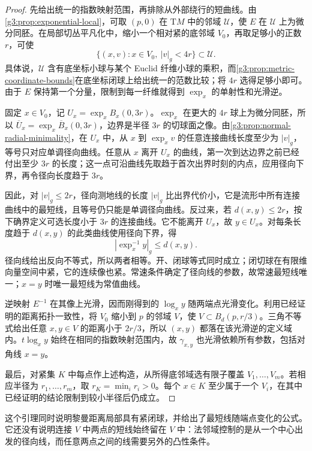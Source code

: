 \begin{proof}
	先给出统一的指数映射范围，再排除从外部绕行的短曲线。由\cref{g3:prop:exponential-local}，可取 \((p,0)\) 在 \(\mathrm{T}M\) 中的邻域 \(\mathcal U\)，使 \(E\) 在 \(\mathcal U\) 上为微分同胚。在局部切丛平凡化中，缩小一个相对紧的底邻域 \(V_0\)，再取足够小的正数 \(r\)，可使
	\[
		\{(x,v):x\in V_0,\ |v|_g<4r\}\subset\mathcal U.
	\]
	具体说，\(\mathcal U\) 含有底坐标小球与某个 Euclid 纤维小球的乘积，而\cref{g3:prop:metric-coordinate-bounds}在底坐标闭球上给出统一的范数比较；将 \(4r\) 选得足够小即可。由于 \(E\) 保持第一个分量，限制到每一纤维就得到 \(\exp_x\) 的单射性和光滑逆。

	固定 \(x\in V_0\)，记 \(U_x=\exp_x B_x(0,3r)\)。\(\exp_x\) 在更大的 \(4r\) 球上为微分同胚，所以 \(\overline U_x=\exp_x\overline B_x(0,3r)\)，边界是半径 \(3r\) 的切球面之像。由\cref{g3:prop:normal-radial-minimality}，在 \(U_x\) 中，从 \(x\) 到 \(\exp_xv\) 的任意连接曲线长度至少为 \(|v|_g\)，等号只对应单调径向曲线。任意从 \(x\) 离开 \(U_x\) 的曲线，第一次到达边界之前已经付出至少 \(3r\) 的长度；这一点可沿曲线先取趋于首次出界时刻的内点，应用径向下界，再令径向长度趋于 \(3r\)。

	因此，对 \(|v|_g\leq2r\)，径向测地线的长度 \(|v|_g\) 比出界代价小，它是流形中所有连接曲线中的最短线，且等号仍只能是单调径向曲线。反过来，若 \(d(x,y)\leq2r\)，按下确界定义可选长度小于 \(3r\) 的连接曲线。它不能离开 \(U_x\)，故 \(y\in U_x\)。对每条长度趋于 \(d(x,y)\) 的此类曲线使用径向下界，得
	\[
		|\exp_x^{-1}y|_g\leq d(x,y).
	\]
	径向线给出反向不等式，所以两者相等。开、闭球等式同时成立；闭切球在有限维向量空间中紧，它的连续像也紧。常速条件确定了径向线的参数，故常速最短线唯一；\(x=y\) 时唯一最短线为常值曲线。

	逆映射 \(E^{-1}\) 在其像上光滑，因而刚得到的 \(\log_xy\) 随两端点光滑变化。利用已经证明的距离拓扑一致性，将 \(V_0\) 缩小到 \(p\) 的邻域 \(V\)，使 \(V\subset B_d(p,r/3)\)。三角不等式给出任意 \(x,y\in V\) 的距离小于 \(2r/3\)，所以 \((x,y)\) 都落在该光滑逆的定义域内。\(t\log_xy\) 始终在相同的指数映射范围内，故 \(\gamma_{x,y}\) 也光滑依赖所有参数，包括对角线 \(x=y\)。

	最后，对紧集 \(K\) 中每点作上述构造，从所得底邻域选有限子覆盖 \(V_1,\ldots,V_m\)。若相应半径为 \(r_1,\ldots,r_m\)，取 \(r_K=\min_i r_i>0\)。每个 \(x\in K\) 至少属于一个 \(V_i\)，在其中已经证明的结论限制到较小半径后仍成立。
\end{proof}

这个引理同时说明黎曼距离局部具有紧闭球，并给出了最短线随端点变化的公式。它还没有说明连接 \(V\) 中两点的短线始终留在 \(V\) 中：法邻域控制的是从一个中心出发的径向线，而任意两点之间的线需要另外的凸性条件。

